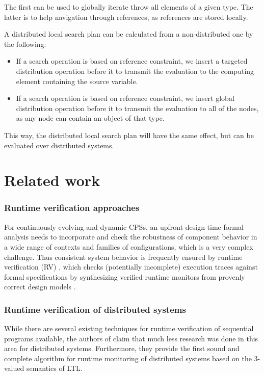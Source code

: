 The first can be used to globally iterate throw all elements of a given type. 
The latter is to help navigation through references, as references are stored locally.

A distributed local search plan can be calculated from a non-distributed one by the following:
\begin{itemize}
	\item If a search operation is based on reference constraint, we insert a targeted distribution operation before it to transmit the evaluation to the computing element containing the source variable.
	\item If a search operation is based on reference constraint, we insert global distribution operation before it to transmit the evaluation to all of the nodes, as any node can contain an object of that type.
\end{itemize}

This way, the distributed local search plan will have the same effect, but can be evaluated over distributed systems.


\section{Related work}

\newcommand{\mrt}{models\-@ run\-time\space}

\subsubsection{Runtime verification approaches}
For continuously evolving and dynamic CPSs, an upfront design-time formal analysis needs to incorporate and check the robustness of component behavior in a wide range of contexts and families of configurations, %
which is a very complex challenge. Thus consistent system behavior is frequently ensured by runtime verification (RV) \cite{Leucker2009}, which checks (potentially incomplete) execution traces against formal specifications by synthesizing verified runtime monitors from provenly correct design models \cite{Mitsch2014,Joshi2017}.

\subsubsection{Runtime verification of distributed systems}
While there are several existing techniques for runtime verification of sequential programs available, the authors of \cite{Mostafa2015} claim that much less research was done in this area for distributed systems. Furthermore, they provide the first sound and complete algorithm for runtime monitoring of distributed systems based on the 3-valued semantics of LTL.

